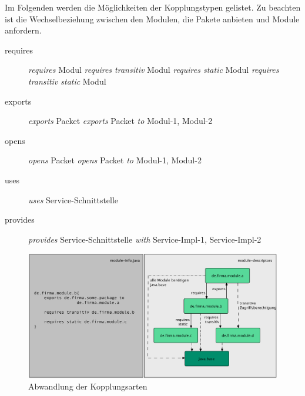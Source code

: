     Im Folgenden werden die Möglichkeiten der Kopplungstypen gelistet. Zu beachten ist die Wechselbeziehung zwischen den Modulen, die Pakete anbieten und Module anfordern. 

    \begin{description}
      \item[requires]\hfill
      \newline \textit{requires} Modul
      \newline \textit{requires transitiv} Modul
      \newline \textit{requires static} Modul
      \newline \textit{requires transitiv static} Modul
      \item[exports]\hfill
      \newline \textit{exports} Packet
      \newline \textit{exports} Packet \textit{to} Modul-1, Modul-2
      \item[opens]\hfill
      \newline \textit{opens} Packet
      \newline \textit{opens} Packet \textit{to} Modul-1, Modul-2
      \item [uses]\hfill
      \newline \textit{uses} Service-Schnittstelle 
      \item[provides]\hfill
        \newline \textit{provides} Service-Schnittstelle \textit{with} Service-Impl-1, Service-Impl-2
  \end{description}

  \begin{figure}[h!]
      \centering
      \includegraphics[width=\textwidth]{material/images/transitiv3.png}
      \caption{Abwandlung der Kopplungsarten}
      \label{fig:abw-kopl}
  \end{figure}

